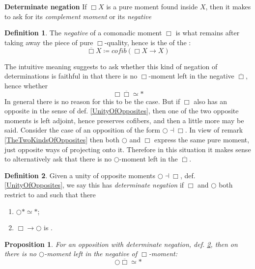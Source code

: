 \documentclass[12pt,titlepage]{article}
\theoremstyle{plain}
\newtheorem{prop}{Proposition}
\theoremstyle{definition}
\newtheorem{defn}{Definition}
\theoremstyle{remark}
\begin{document}
\textbf{Determinate negation}
If $\Box X$ is a pure moment found inside $X$, then it makes to ask for its \emph{complement moment} or its \emph{negative}
\begin{defn}
\label{NegativeMoment}\hypertarget{NegativeMoment}{}
The \emph{negative} of a comonadic moment $\Box$ is what remains after taking away the piece of pure $\Box$-quality, hence is the  of the :
\begin{displaymath}
\overline{\Box} X \coloneqq cofib(\Box X \to X)
\end{displaymath}
\end{defn}
The intuitive meaning suggests to ask whether this kind of negation of determinations is faithful in that there is no $\Box$-moment left in the negative $\overline{\Box}$, hence whether
\begin{displaymath}
\Box \overline{\Box} \simeq \ast
\end{displaymath}
In general there is no reason for this to be the case. But if $\Box$ also has an opposite in the sense of def. \ref{UnityOfOpposites}, then one of the two opposite moments is left adjoint, hence preserves cofibers, and then a little more may be said.
Consider the case of an opposition of the form $\bigcirc \dashv \Box$. In view of remark \ref{TheTwoKindsOfOpposites} then both $\bigcirc$ and $\Box$ express the same pure moment, just opposite ways of projecting onto it. Therefore in this situation it makes sense to alternatively ask that there is no $\bigcirc$-moment left in the $\overline{\Box}$.
\begin{defn}
\label{CompleteOpposition}\hypertarget{CompleteOpposition}{}
Given a unity of opposite moments $\bigcirc \dashv \Box$, def. \ref{UnityOfOpposites}, we say this has \emph{determinate negation} if $\Box$ and $\bigcirc$ both restrict to  and such that there
\begin{enumerate}%
\item $\bigcirc \ast \simeq \ast$;
\item $\Box  \longrightarrow \bigcirc$ is .
\end{enumerate}
\end{defn}
\begin{prop}
\label{AccuracyOfNegatives}\hypertarget{AccuracyOfNegatives}{}
For an opposition with determinate negation, def. \ref{CompleteOpposition}, then on  there is no $\bigcirc$-moment left in the negative of $\Box$-moment:
\begin{displaymath}
\bigcirc \overline{\Box} \simeq \ast
\end{displaymath}
\end{prop}
\end{document}
